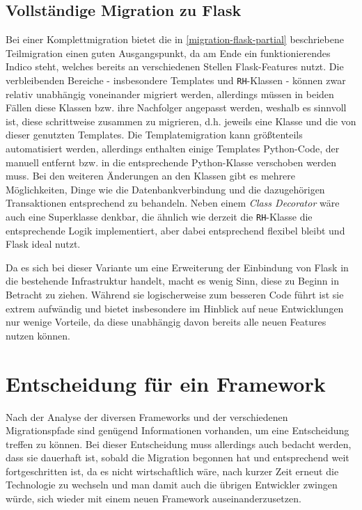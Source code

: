 \subsection{Vollständige Migration zu Flask}
Bei einer Komplettmigration bietet die in \autoref{migration-flask-partial} beschriebene
Teilmigration einen guten Ausgangspunkt, da am Ende ein funktionierendes Indico steht, welches
bereits an verschiedenen Stellen Flask-Features nutzt. Die verbleibenden Bereiche - insbesondere
Templates und \lstinline{RH}-Klassen - können zwar relativ unabhängig voneinander migriert werden,
allerdings müssen in beiden Fällen diese Klassen bzw. ihre Nachfolger angepasst werden, weshalb es
sinnvoll ist, diese schrittweise zusammen zu migrieren, d.h. jeweils eine Klasse und die von dieser
genutzten Templates. Die Templatemigration kann größtenteils automatisiert werden, allerdings
enthalten einige Templates Python-Code, der manuell entfernt bzw. in die entsprechende Python-Klasse
verschoben werden muss. Bei den weiteren Änderungen an den Klassen gibt es mehrere Möglichkeiten,
Dinge wie die Datenbankverbindung und die dazugehörigen Transaktionen entsprechend zu behandeln.
Neben einem \emph{Class Decorator} wäre auch eine Superklasse denkbar, die ähnlich wie derzeit die
\lstinline{RH}-Klasse die entsprechende Logik implementiert, aber dabei entsprechend flexibel bleibt
und Flask ideal nutzt.

Da es sich bei dieser Variante um eine Erweiterung der Einbindung von Flask in die bestehende
Infrastruktur handelt, macht es wenig Sinn, diese zu Beginn in Betracht zu ziehen. Während sie
logischerweise zum besseren Code führt ist sie extrem aufwändig und bietet insbesondere im Hinblick
auf neue Entwicklungen nur wenige Vorteile, da diese unabhängig davon bereits alle neuen Features
nutzen können.


\section{Entscheidung für ein Framework}
Nach der Analyse der diversen Frameworks und der verschiedenen Migrationspfade sind genügend
Informationen vorhanden, um eine Entscheidung treffen zu können. Bei dieser Entscheidung muss
allerdings auch bedacht werden, dass sie dauerhaft ist, sobald die Migration begonnen hat und
entsprechend weit fortgeschritten ist, da es nicht wirtschaftlich wäre, nach kurzer Zeit erneut die
Technologie zu wechseln und man damit auch die übrigen Entwickler zwingen würde, sich wieder mit
einem neuen Framework auseinanderzusetzen.

